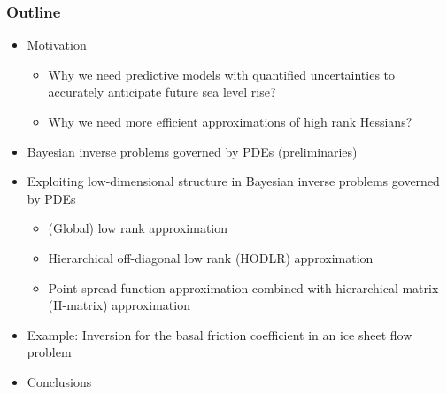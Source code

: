 \documentclass[10pt,final,xcolor=dvipsnames]{beamer}
\begin{document}
\begin{frame}
  \frametitle{Outline}


  \begin{itemize}
  \item Motivation
    \vspace{0.02in}
    \begin{itemize}
    \item Why we need predictive models with quantified uncertainties
      to accurately anticipate future sea level rise?
      \vspace{0.02in}
    \item Why we need more efficient approximations of high rank
      Hessians?
    \end{itemize}
    \vspace{0.02in}
  \item Bayesian inverse problems governed by PDEs (preliminaries)
    \vspace{0.02in}
  \item Exploiting low-dimensional structure in Bayesian inverse problems governed by PDEs
    \vspace{0.02in}
    \begin{itemize}
    \item (Global) low rank approximation
      \vspace{0.02in}
    \item Hierarchical off-diagonal low rank (HODLR) approximation
      \vspace{0.02in}
    \item Point spread function approximation combined with
      hierarchical matrix (H-matrix) approximation
    \end{itemize}
    \vspace{0.02in}
  \item Example: Inversion for the basal friction
    coefficient in an ice sheet flow problem
    \vspace{0.02in}
  \item Conclusions
  \end{itemize}

\end{frame}
\end{document}
